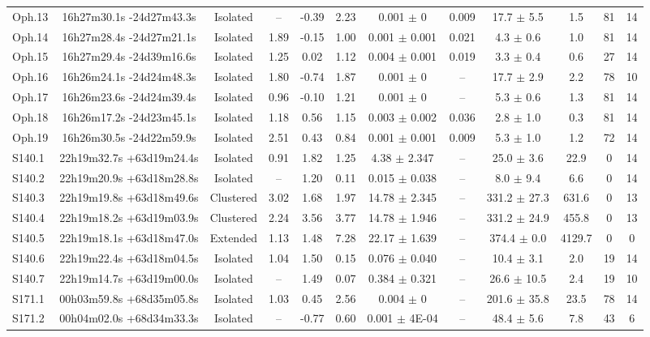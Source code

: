 \begin{landscape}
\begin{longtable}{lccccccccccc}
Oph.13	&	16h27m30.1s -24d27m43.3s	&	Isolated	&	--	&	-0.39	&	2.23	&	0.001	$\pm$	0	&	0.009	&	17.7	$\pm$	5.5	&	1.5	&	81	&	14	\\
Oph.14	&	16h27m28.4s -24d27m21.1s	&	Isolated	&	1.89	&	-0.15	&	1.00	&	0.001	$\pm$	0.001	&	0.021	&	4.3	$\pm$	0.6	&	1.0	&	81	&	14	\\
Oph.15	&	16h27m29.4s -24d39m16.6s	&	Isolated	&	1.25	&	0.02	&	1.12	&	0.004	$\pm$	0.001	&	0.019	&	3.3	$\pm$	0.4	&	0.6	&	27	&	14	\\
Oph.16	&	16h26m24.1s -24d24m48.3s	&	Isolated	&	1.80	&	-0.74	&	1.87	&	0.001	$\pm$	0	&	--	&	17.7	$\pm$	2.9	&	2.2	&	78	&	10	\\
Oph.17	&	16h26m23.6s -24d24m39.4s	&	Isolated	&	0.96	&	-0.10	&	1.21	&	0.001	$\pm$	0	&	--	&	5.3	$\pm$	0.6	&	1.3	&	81	&	14	\\
Oph.18	&	16h26m17.2s -24d23m45.1s	&	Isolated	&	1.18	&	0.56	&	1.15	&	0.003	$\pm$	0.002	&	0.036	&	2.8	$\pm$	1.0	&	0.3	&	81	&	14	\\
Oph.19	&	16h26m30.5s -24d22m59.9s	&	Isolated	&	2.51	&	0.43	&	0.84	&	0.001	$\pm$	0.001	&	0.009	&	5.3	$\pm$	1.0	&	1.2	&	72	&	14	\\
S140.1	&	22h19m32.7s +63d19m24.4s	&	Isolated	&	0.91	&	1.82	&	1.25	&	4.38	$\pm$	2.347	&	--	&	25.0	$\pm$	3.6	&	22.9	&	0	&	14	\\
S140.2	&	22h19m20.9s +63d18m28.8s	&	Isolated	&	--	&	1.20	&	0.11	&	0.015	$\pm$	0.038	&	--	&	8.0	$\pm$	9.4	&	6.6	&	0	&	14	\\
S140.3	&	22h19m19.8s +63d18m49.6s	&	Clustered	&	3.02	&	1.68	&	1.97	&	14.78	$\pm$	2.345	&	--	&	331.2	$\pm$	27.3	&	631.6	&	0	&	13	\\
S140.4	&	22h19m18.2s +63d19m03.9s	&	Clustered	&	2.24	&	3.56	&	3.77	&	14.78	$\pm$	1.946	&	--	&	331.2	$\pm$	24.9	&	455.8	&	0	&	13	\\
S140.5	&	22h19m18.1s +63d18m47.0s	&	Extended	&	1.13	&	1.48	&	7.28	&	22.17	$\pm$	1.639	&	--	&	374.4	$\pm$	0.0	&	4129.7	&	0	&	0	\\
S140.6	&	22h19m22.4s +63d18m04.5s	&	Isolated	&	1.04	&	1.50	&	0.15	&	0.076	$\pm$	0.040	&	--	&	10.4	$\pm$	3.1	&	2.0	&	19	&	14	\\
S140.7	&	22h19m14.7s +63d19m00.0s	&	Isolated	&	--	&	1.49	&	0.07	&	0.384	$\pm$	0.321	&	--	&	26.6	$\pm$	10.5	&	2.4	&	19	&	10	\\
S171.1	&	00h03m59.8s +68d35m05.8s	&	Isolated	&	1.03	&	0.45	&	2.56	&	0.004	$\pm$	0	&	--	&	201.6	$\pm$	35.8	&	23.5	&	78	&	14	\\
S171.2	&	00h04m02.0s +68d34m33.3s	&	Isolated	&	--	&	-0.77	&	0.60	&	0.001	$\pm$	4E-04	&	--	&	48.4	$\pm$	5.6	&	7.8	&	43	&	6	\\
\end{longtable}																																	
\end{landscape}			
																						
